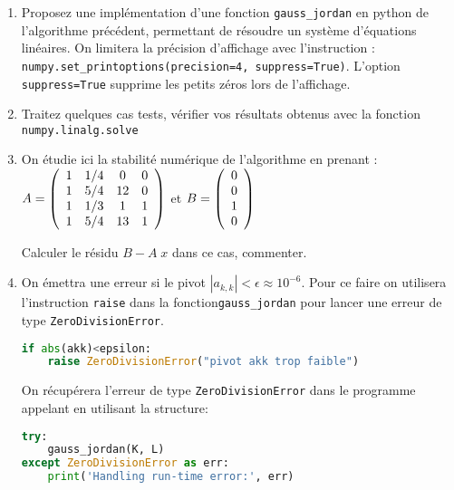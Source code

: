 \documentclass[a4paper, 10pt]{article}
\newcommand{\insertlisting}[2]
  {\begin{itemize}\item[]\end{itemize}}
\begin{document}
\begin{enumerate} 
 \item Proposez une implémentation d'une fonction {\tt gauss\_jordan} en python
 de l'algorithme précédent, permettant de résoudre un système d'équations linéaires.
 On limitera la précision d'affichage avec l'instruction :
{\tt numpy.set\_printoptions(precision=4, suppress=True)}.
L'option {\tt suppress=True} supprime les petits zéros lors de l'affichage.
 \item Traitez quelques cas tests,  vérifier vos résultats obtenus avec la fonction {\tt numpy.linalg.solve}  

\item On étudie ici la stabilité numérique de l'algorithme en prenant :\\
$A=\left(
\begin{array}{c c c c}
1  & 1/4   &   0 & 0  \\
1  & 5/4   & 12 & 0   \\
1  & 1/3  &  1   & 1  \\
1 & 5/4  & 13  &  1  
\end{array}
\right)$
et $B=\left(
\begin{array}{c c c c}
0  \\
0    \\
1  \\
0  
\end{array}
\right)$

Calculer le résidu $B-A\; x$ dans ce cas, commenter.
 
\item On émettra une erreur si le pivot $|a_{k,k}|< \epsilon \approx 10^{-6}$.
Pour ce faire on utilisera l'instruction {\tt raise} dans la fonction{\tt gauss\_jordan} 
pour lancer une erreur de type {\tt ZeroDivisionError}.
\begin{lstlisting}[language=Python]
 if abs(akk)<epsilon:
    raise ZeroDivisionError("pivot akk trop faible")
\end{lstlisting}

On récupérera l'erreur de type {\tt ZeroDivisionError} 
dans le programme appelant en utilisant la structure:
\begin{lstlisting}[language=Python]
try:
    gauss_jordan(K, L)
except ZeroDivisionError as err:
    print('Handling run-time error:', err)
\end{lstlisting}

\end{enumerate}
 
\end{document}
